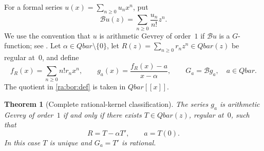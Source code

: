 \documentclass[11pt,a4paper]{article}
\newcommand{\QB}{\overline{\mathbb Q}}
\newcommand{\Qbar}{\overline{\mathbb Q}}
\newtheorem{theorem}{Theorem}[section]
\theoremstyle{definition}
\theoremstyle{remark}
\theoremstyle{plain}
\numberwithin{equation}{section}
\def\Qbar{Qbar}\def\QB{Qbar}\def\mathbb#1{#1}%
\begin{document}
For a formal series $u(x)=\sum_{n\ge0}u_nx^n$, put
\[
 \mathcal B u(z)=\sum_{n\ge0}\frac{u_n}{n!}z^n.
\]
We use the convention that $u$ is arithmetic Gevrey of order~$1$ if
$\mathcal B u$ is a $G$-function; see \cite{FRmixed}.  Let
$\alpha\in\Qbar\setminus\{0\}$, let
$R(z)=\sum_{n\ge0}r_nz^n\in\Qbar(z)$ be regular at~$0$, and define
\begin{equation}\label{ra:bor:def}
 f_R(x)=\sum_{n\ge0}n!r_nx^n,\qquad
 g_a(x)=\frac{f_R(x)-a}{x-\alpha},\qquad
 G_a=\mathcal B g_a,\quad a\in\Qbar.
\end{equation}
The quotient in \eqref{ra:bor:def} is taken in $\Qbar[[x]]$.

\begin{theorem}[Complete rational-kernel classification]\label{ra:bor:class}
The series $g_a$ is arithmetic Gevrey of order~$1$ if and only if
there exists $T\in\Qbar(z)$, regular at~$0$, such that
\begin{equation}\label{ra:bor:exact}
 R=T-\alpha T',\qquad a=T(0).
\end{equation}
In this case $T$ is unique and $G_a=T'$ is rational.
\end{theorem}
\end{document}
